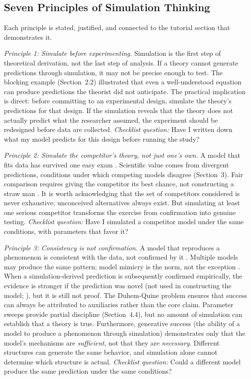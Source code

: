 \documentclass[fleqn,10pt]{wlscirep}
\begin{document}
\begin{linenumbers}
\subsection{Seven Principles of Simulation Thinking}

Each principle is stated, justified, and connected to the tutorial section that demonstrates it.

\emph{Principle 1: Simulate before experimenting.} Simulation is the first step of theoretical derivation, not the last step of analysis. If a theory cannot generate predictions through simulation, it may not be precise enough to test. The blocking example (Section~2.2) illustrated that even a well-understood equation can produce predictions the theorist did not anticipate. The practical implication is direct: before committing to an experimental design, simulate the theory's predictions for that design. If the simulation reveals that the theory does not actually predict what the researcher assumed, the experiment should be redesigned before data are collected. \emph{Checklist question:} Have I written down what my model predicts for this design before running the study?

\emph{Principle 2: Simulate the competitor's theory, not just one's own.} A model that fits data has survived one easy exam \citep{roberts2000persuasive}. Scientific value comes from divergent predictions, conditions under which competing models disagree (Section~3). Fair comparison requires giving the competitor its best chance, not constructing a straw man \citep{kruschke2008models}. It is worth acknowledging that the set of competitors considered is never exhaustive; unconceived alternatives always exist. But simulating at least one serious competitor transforms the exercise from confirmation into genuine testing. \emph{Checklist question:} Have I simulated a competitor model under the same conditions, with parameters that favor it?

\emph{Principle 3: Consistency is not confirmation.} A model that reproduces a phenomenon is consistent with the data, not confirmed by it \citep{box1976science}. Multiple models may produce the same pattern; model mimicry is the norm, not the exception \citep{pitt2002toward}. When a simulation-derived prediction is subsequently confirmed empirically, the evidence is stronger if the prediction was novel (not used in constructing the model; \citep{mayo1996error}), but it is still not proof. The Duhem-Quine problem ensures that success can always be attributed to auxiliaries rather than the core claim. Parameter sweeps provide partial discipline (Section~4.4), but no amount of simulation can establish that a theory is true. Furthermore, generative success (the ability of a model to produce a phenomenon through simulation) demonstrates only that the model's mechanisms are \emph{sufficient}, not that they are \emph{necessary}. Different structures can generate the same behavior, and simulation alone cannot determine which structure is actual. \emph{Checklist question:} Could a different model produce the same prediction under the same conditions?


\end{linenumbers}
\end{document}
